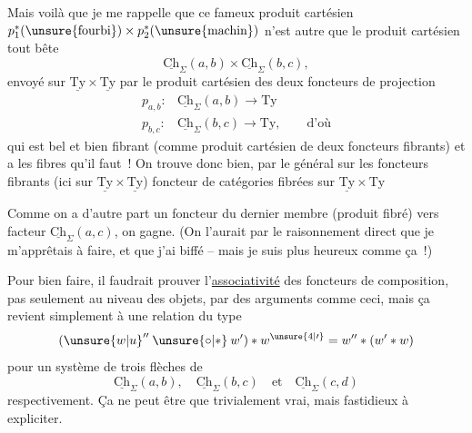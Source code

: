 Mais voilà que je me rappelle que ce fameux produit cartésien $p_1^*(\text{\unsure{fourbi}})\times p_2^*(\text{\unsure{machin}})$ n'est autre que le produit cartésien tout bête
\[
\underline{\mathrm{Ch}}_\Sigma(a,b)\times\underline{\mathrm{Ch}}_\Sigma(b,c),
\]
envoyé sur $\underline{\mathrm{Ty}}\times\underline{\mathrm{Ty}}$ par le produit cartésien des deux foncteurs de projection
\[
\begin{aligned}
p_{a,b}:{}&\underline{\mathrm{Ch}}_\Sigma(a,b)\longrightarrow\mathrm{Ty}\\
p_{b,c}:{}&\underline{\mathrm{Ch}}_\Sigma(b,c)\longrightarrow\mathrm{Ty},\qquad\text{d'où}
\end{aligned}
\]
qui est bel et bien fibrant (comme produit cartésien de deux foncteurs fibrants) et a les fibres qu'il faut~! On trouve donc bien, par le  général sur les foncteurs fibrants (ici sur $\underline{\mathrm{Ty}}\times\underline{\mathrm{Ty}}$)  foncteur de catégories fibrées sur $\underline{\mathrm{Ty}}\times\mathrm{Ty}$

Comme on a d'autre part un  foncteur du dernier membre (produit fibré) vers  facteur $\underline{\mathrm{Ch}}_\Sigma(a,c)$, on gagne. (On l'aurait  par le raisonnement direct que je m'apprêtais à faire, et que j'ai biffé -- mais je suis plus heureux comme ça~!)

Pour bien faire, il faudrait prouver l'\uline{associativité} des foncteurs de composition, pas seulement au niveau des objets, par des arguments comme ceci, mais ça revient simplement à une relation du type
\[
(\unsure{w|u}''\mathbin{\unsure{\circ|*}}w')*w^{\unsure{4|\prime}}=w''*(w'*w)
\]
pour  un système de trois flèches de
\[
\underline{\mathrm{Ch}}_\Sigma(a,b),\quad \underline{\mathrm{Ch}}_\Sigma(b,c)\quad\text{et}\quad\underline{\mathrm{Ch}}_\Sigma(c,d)
\]
respectivement. Ça ne peut être que trivialement
vrai, mais fastidieux à expliciter.

